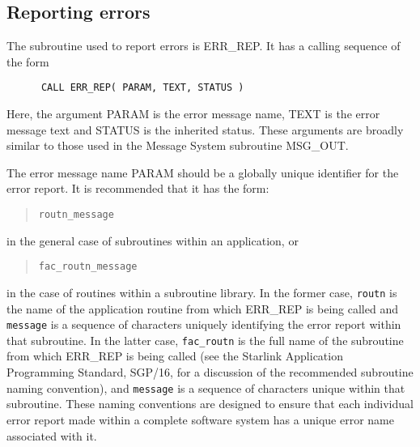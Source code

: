 \subsection {Reporting errors} \label{report_sect}

The subroutine used to report errors is ERR\_REP. 
It has a calling sequence of the form

\begin {small}
\begin{verbatim}
      CALL ERR_REP( PARAM, TEXT, STATUS )
\end{verbatim}
\end {small}

Here, the argument PARAM is the error message name, TEXT is the error message
text and STATUS is the inherited status.
These arguments are broadly similar to those used in the Message System
subroutine MSG\_OUT. 

The error message name PARAM should be a globally unique identifier for the
error report.
It is recommended that it has the form:

\begin {quote}
\begin {small}
\begin{verbatim}
routn_message
\end{verbatim}
\end {small}
\end {quote}

in the general case of subroutines within an application, or

\begin {quote}
\begin {small}
\begin{verbatim}
fac_routn_message
\end{verbatim}
\end {small}
\end {quote}

in the case of routines within a subroutine library.
In the former case, {\tt routn} is the name of the application routine from
which ERR\_REP is being called and {\tt message} is a sequence of characters
uniquely identifying the error report within that subroutine. 
In the latter case, {\tt fac\_routn} is the full name of the subroutine from
which ERR\_REP is being called (see the Starlink Application Programming
Standard, SGP/16, for a discussion of the recommended subroutine naming
convention), and {\tt message} is a sequence of characters unique within 
that subroutine.
These naming conventions are designed to ensure that each individual error
report made within a complete software system has a unique error name
associated with it. 

